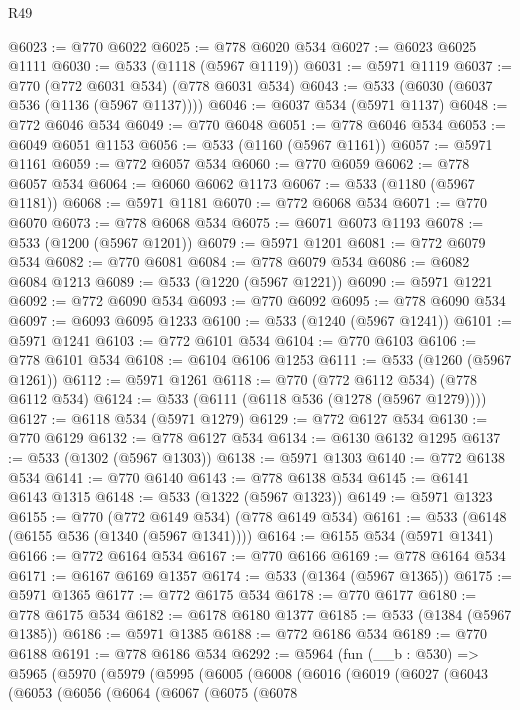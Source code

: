 \begin{lexlean}{R49}
\begin{coremodule}
@6023 := @770 @6022
@6025 := @778 @6020 @534
@6027 := @6023 @6025 @1111
@6030 := @533 (@1118 (@5967 @1119))
@6031 := @5971 @1119
@6037 := @770 (@772 @6031 @534) (@778 @6031 @534)
@6043 := @533 (@6030 (@6037 @536 (@1136 (@5967 @1137))))
@6046 := @6037 @534 (@5971 @1137)
@6048 := @772 @6046 @534
@6049 := @770 @6048
@6051 := @778 @6046 @534
@6053 := @6049 @6051 @1153
@6056 := @533 (@1160 (@5967 @1161))
@6057 := @5971 @1161
@6059 := @772 @6057 @534
@6060 := @770 @6059
@6062 := @778 @6057 @534
@6064 := @6060 @6062 @1173
@6067 := @533 (@1180 (@5967 @1181))
@6068 := @5971 @1181
@6070 := @772 @6068 @534
@6071 := @770 @6070
@6073 := @778 @6068 @534
@6075 := @6071 @6073 @1193
@6078 := @533 (@1200 (@5967 @1201))
@6079 := @5971 @1201
@6081 := @772 @6079 @534
@6082 := @770 @6081
@6084 := @778 @6079 @534
@6086 := @6082 @6084 @1213
@6089 := @533 (@1220 (@5967 @1221))
@6090 := @5971 @1221
@6092 := @772 @6090 @534
@6093 := @770 @6092
@6095 := @778 @6090 @534
@6097 := @6093 @6095 @1233
@6100 := @533 (@1240 (@5967 @1241))
@6101 := @5971 @1241
@6103 := @772 @6101 @534
@6104 := @770 @6103
@6106 := @778 @6101 @534
@6108 := @6104 @6106 @1253
@6111 := @533 (@1260 (@5967 @1261))
@6112 := @5971 @1261
@6118 := @770 (@772 @6112 @534) (@778 @6112 @534)
@6124 := @533 (@6111 (@6118 @536 (@1278 (@5967 @1279))))
@6127 := @6118 @534 (@5971 @1279)
@6129 := @772 @6127 @534
@6130 := @770 @6129
@6132 := @778 @6127 @534
@6134 := @6130 @6132 @1295
@6137 := @533 (@1302 (@5967 @1303))
@6138 := @5971 @1303
@6140 := @772 @6138 @534
@6141 := @770 @6140
@6143 := @778 @6138 @534
@6145 := @6141 @6143 @1315
@6148 := @533 (@1322 (@5967 @1323))
@6149 := @5971 @1323
@6155 := @770 (@772 @6149 @534) (@778 @6149 @534)
@6161 := @533 (@6148 (@6155 @536 (@1340 (@5967 @1341))))
@6164 := @6155 @534 (@5971 @1341)
@6166 := @772 @6164 @534
@6167 := @770 @6166
@6169 := @778 @6164 @534
@6171 := @6167 @6169 @1357
@6174 := @533 (@1364 (@5967 @1365))
@6175 := @5971 @1365
@6177 := @772 @6175 @534
@6178 := @770 @6177
@6180 := @778 @6175 @534
@6182 := @6178 @6180 @1377
@6185 := @533 (@1384 (@5967 @1385))
@6186 := @5971 @1385
@6188 := @772 @6186 @534
@6189 := @770 @6188
@6191 := @778 @6186 @534
@6292 := @5964
    (fun (__b : @530) =>
    @5965
      (@5970
        (@5979
          (@5995
            (@6005
              (@6008
                (@6016
                  (@6019
                    (@6027
                      (@6043
                        (@6053
                          (@6056
                            (@6064
                              (@6067
                                (@6075
                                  (@6078

\end{coremodule}
\end{lexlean}
